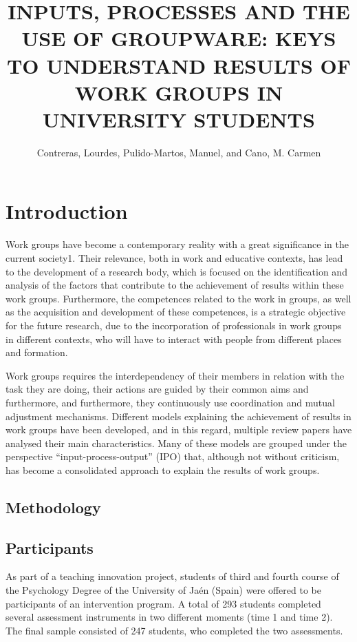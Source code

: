 \documentclass[a4paper,man,natbib]{apa6}
\title{INPUTS, PROCESSES AND THE USE OF GROUPWARE: KEYS TO UNDERSTAND RESULTS OF WORK GROUPS IN UNIVERSITY STUDENTS}
\author{Contreras, Lourdes, Pulido-Martos, Manuel, and Cano, M. Carmen}
\affiliation{University of Jaén (SPAIN)}
\begin{document}
\maketitle

\section{Introduction}

Work groups have become a contemporary reality with a great significance in the current society1. Their relevance, both in work and educative contexts, has lead to the development of a research body, which is focused on the identification and analysis of the factors that contribute to the achievement of results within these work groups. Furthermore, the competences related to the work in groups, as well as the acquisition and development of these competences, is a strategic objective for the future research, due to the incorporation of professionals in work groups in different contexts, who will have to interact with people from different places and formation.

Work groups requires the interdependency of their members in relation with the task they are doing, their actions are guided by their common aims and furthermore, and furthermore, they continuously use coordination and mutual adjustment mechanisms. Different models explaining the achievement of results in work groups have been developed, and in this regard, multiple review papers have analysed their main characteristics. Many of these models are grouped under the perspective “input-process-output” (IPO) that, although not without criticism, has become a consolidated approach to explain the results of work groups.



\subsection{Methodology}

\subsection{Participants}

As part of a teaching innovation project, students of third and fourth course of the Psychology Degree of the University of Jaén (Spain) were offered to be participants of an intervention program. A total of 293 students completed several assessment instruments in two different moments (time 1 and time 2). The final sample consisted of 247 students, who completed the two assessments.
\end{document}
